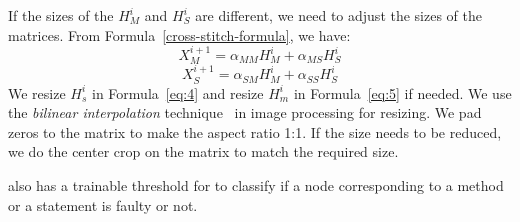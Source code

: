 

If the sizes of the $H_M^{i}$ and $H_S^{i}$ are different, we need to adjust the sizes of the matrices. From Formula~\ref{cross-stitch-formula}, we have:
\begin{equation}\label{eq:4}
	X_M^{i+1} = \alpha_{MM}H_M^{i} + \alpha_{MS}H_S^{i}
\end{equation}
\begin{equation}\label{eq:5}
  X_S^{i+1} = \alpha_{SM}H_M^{i} + \alpha_{SS}H_S^{i}
\end{equation}
We resize $H_s^{i}$ in Formula~\ref{eq:4} and resize $H_m^{i}$ in
Formula~\ref{eq:5} if needed. We use the {\em bilinear interpolation}
technique~\cite{bilinear-interpolation} in image processing for
resizing. We pad zeros to the matrix to make the aspect ratio 1:1. If
the size needs to be reduced, we do the center crop on the matrix to
match the required size.

{\tool} also has a trainable threshold for  to classify
if a node corresponding to a method or a statement is faulty or not.


